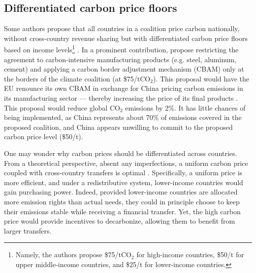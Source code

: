 \documentclass[12pt,english]{article}
\begin{document}

\subsection{Differentiated carbon price floors}

Some authors propose that all countries in a coalition price carbon nationally, without cross-country revenue sharing but with differentiated carbon price floors based on income levels\footnote{Namely, the authors propose \$75/tCO$_\text{2}$ for high-income countries, \$50/t for upper middle-income countries, and \$25/t for lower-income countries.} \citep{parry_proposal_2021,wolfram_building_2025}. In a prominent contribution, \cite{wolfram_building_2025} propose restricting the agreement to carbon-intensive manufacturing products (e.g. steel, aluminum, cement) and applying a carbon border adjustment mechanism (CBAM) only at the borders of the climate coalition (at \$75/tCO$_\text{2}$). This proposal would have the EU renounce its own CBAM in exchange for China pricing carbon emissions in its manufacturing sector --- thereby increasing the price of its final products \citep{chateau_global_2024}. This proposal would reduce global CO$_\text{2}$ emissions by 2\%. It has little chances of being implemented, as China represents about 70\% of emissions covered in the proposed coalition, and China appears unwilling to commit to the proposed carbon price level (\$50/t). 

One may wonder why carbon prices should be differentiated across countries. 
From a theoretical perspective, absent any imperfections, a uniform carbon price coupled with cross-country transfers is optimal \citep{aldy_promise_2012}. %
Specifically, a uniform price is more efficient, and under a redistributive system, %
lower-income countries would gain purchasing power. %
Indeed, provided lower-income countries are allocated more emission rights than actual needs, they could in principle choose to keep their emissions stable while receiving
a financial transfer. Yet, the high carbon price would provide incentives to decarbonize, allowing them to benefit from larger transfers. 
\end{document}
